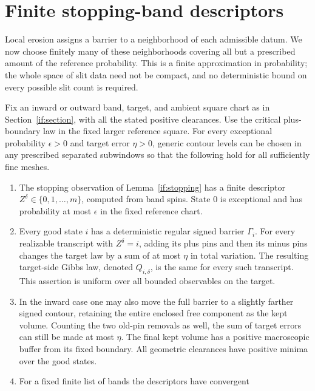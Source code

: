 \section{Finite stopping-band descriptors}\label{de:section}

Local erosion assigns a barrier to a neighborhood of each admissible
datum. We now choose finitely many of these neighborhoods covering all
but a prescribed amount of the reference probability. This is a finite
approximation in probability; the whole space of slit data need not be
compact, and no deterministic bound on every possible slit count is
required.

\begin{theorem}\label{if:band-transfer}
Fix an inward or outward band, target, and ambient square chart as in
Section~\ref{if:section}, with all the stated positive clearances.
Use the critical plus-boundary law in the fixed larger reference square.
For every exceptional probability
$\epsilon>0$ and target error $\eta>0$, generic contour levels can be
chosen in any prescribed separated subwindows so that the following
hold for all sufficiently fine meshes.
\begin{enumerate}
\item The stopping observation of Lemma~\ref{if:stopping} has a finite
      descriptor $Z^\delta\in\{0,1,\ldots,m\}$, computed from band
      spins.  State $0$ is exceptional and has probability at most
      $\epsilon$ in the fixed reference chart.
\item Every good state $i$ has a deterministic regular signed barrier
      $\Gamma_i$.  For every realizable transcript with $Z^\delta=i$,
      adding its plus pins and then its minus pins changes the target
      law by a sum of at most $\eta$ in total variation.  The resulting
      target-side Gibbs law, denoted $Q_{i,\delta}$, is the same for
      every such transcript.  This assertion is uniform over all
      bounded observables on the target.
\item In the inward case one may also move the full barrier to a
      slightly farther signed contour, retaining the entire enclosed
      free component as the kept volume.  Counting the two old-pin
      removals as well, the sum of target errors can still be made
      at most $\eta$.  The final kept volume has a positive
      macroscopic buffer from its fixed boundary.  All geometric
      clearances have positive minima over the good states.
\item For a fixed finite list of bands the descriptors have convergent

\end{enumerate}
\end{theorem}
